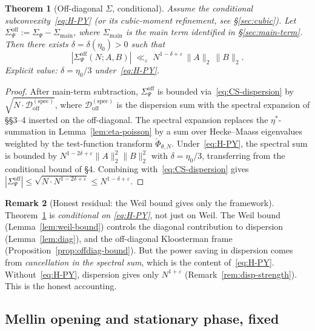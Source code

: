 \documentclass[11pt]{article}
\newtheorem{theorem}{Theorem}[section]
\theoremstyle{definition}
\newtheorem{remark}[theorem]{Remark}
\begin{document}
\begin{theorem}[Off-diagonal $\Sigma$, conditional]\label{thm:offdiag-Sigma}
Assume the conditional subconvexity~\eqref{eq:H-PY} (or its cubic-moment refinement, see \S\ref{sec:cubic}). Let $\Sigma^{\mathrm{off}}_\Psi:=\Sigma_\Psi-\Sigma_{\mathrm{main}}$, where $\Sigma_{\mathrm{main}}$ is the main term identified in \S\ref{sec:main-term}. Then there exists $\delta=\delta(\eta_0)>0$ such that
\[
|\Sigma^{\mathrm{off}}_\Psi(N;A,B)|\;\ll_\varepsilon\;N^{1-\delta+\varepsilon}\,\|A\|_2\,\|B\|_2.
\]
Explicit value: $\delta=\eta_0/3$ under~\eqref{eq:H-PY}.
\end{theorem}

\begin{proof}
After main-term subtraction, $\Sigma^{\mathrm{off}}_\Psi$ is bounded via~\eqref{eq:CS-dispersion} by $\sqrt{N\cdot\mathcal{D}_{\mathrm{off}}^{(\mathrm{spec})}}$, where $\mathcal{D}_{\mathrm{off}}^{(\mathrm{spec})}$ is the dispersion sum with the spectral expansion of \S\S3--4 inserted on the off-diagonal. The spectral expansion replaces the $\eta^*$-summation in Lemma~\ref{lem:eta-poisson} by a sum over Hecke--Maass eigenvalues weighted by the test-function transform $\check\Phi_{\theta,N}$. Under~\eqref{eq:H-PY}, the spectral sum is bounded by $N^{1-2\delta+\varepsilon}\|A\|_2^2\|B\|_2^2$ with $\delta=\eta_0/3$, transferring from the conditional bound of \S4. Combining with~\eqref{eq:CS-dispersion} gives $|\Sigma^{\mathrm{off}}_\Psi|\le\sqrt{N\cdot N^{1-2\delta+\varepsilon}}\le N^{1-\delta+\varepsilon}$.
\end{proof}

\begin{remark}[Honest residual: the Weil bound gives only the framework]\label{rem:weil-frame}
Theorem~\ref{thm:offdiag-Sigma} is \emph{conditional on \eqref{eq:H-PY}}, not just on Weil. The Weil bound (Lemma~\ref{lem:weil-bound}) controls the diagonal contribution to dispersion (Lemma~\ref{lem:diag}), and the off-diagonal Kloosterman frame (Proposition~\ref{prop:offdiag-bound}). But the power saving in dispersion comes from \emph{cancellation in the spectral sum}, which is the content of~\eqref{eq:H-PY}. Without~\eqref{eq:H-PY}, dispersion gives only $N^{1+\varepsilon}$ (Remark~\ref{rem:disp-strength}). This is the honest accounting.
\end{remark}

\subsection{Mellin opening and stationary phase, fixed}\label{sec:mellin-fixed}
\end{document}
